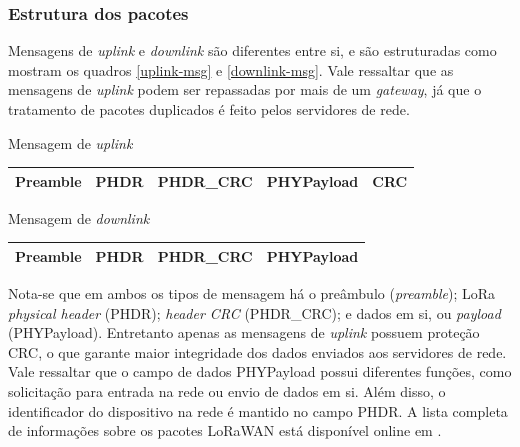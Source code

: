 \documentclass[oneside,openright,12pt]{ufsm_2015} %
\begin{document}
\subsubsection{Estrutura dos pacotes}
Mensagens de \textit{uplink} e \textit{downlink} são diferentes entre si, e são estruturadas como mostram os quadros \ref{uplink-msg} e \ref{downlink-msg}. Vale ressaltar que as mensagens de \textit{uplink} podem ser repassadas por mais de um \textit{gateway}, já que o tratamento de pacotes duplicados é feito pelos servidores de rede.

\begin{quadro}
   	    \caption{Mensagem de \textit{uplink}}
	    \centering
	    \begin{tabular}{| c | c | c | c | c |}
	    \hline
	    Preamble & PHDR & PHDR\_CRC & PHYPayload & CRC \\
	    \hline
	    \end{tabular}
	    \vspace{\baselineskip} %
	    \label{uplink-msg}
\end{quadro}

\begin{quadro}
   	    \caption{Mensagem de \textit{downlink}}
	    \centering
	    \begin{tabular}{| c | c | c | c |}
	    \hline
	    Preamble & PHDR & PHDR\_CRC & PHYPayload \\
	    \hline
	    \end{tabular}
	    \vspace{\baselineskip} %
	    \label{downlink-msg}
\end{quadro}

Nota-se que em ambos os tipos de mensagem há o preâmbulo (\textit{preamble}); LoRa \textit{physical header} (PHDR); \textit{header CRC} (PHDR\_CRC); e dados em si, ou \textit{payload} (PHYPayload). Entretanto apenas as mensagens de \textit{uplink} possuem proteção CRC, o que garante maior integridade dos dados enviados aos servidores de rede. Vale ressaltar que o campo de dados PHYPayload possui diferentes funções, como solicitação para entrada na rede ou envio de dados em si. Além disso, o identificador do dispositivo na rede é mantido no campo PHDR. A lista completa de informações sobre os pacotes LoRaWAN está disponível online em \cite{lorawan-specification}.
\end{document}
